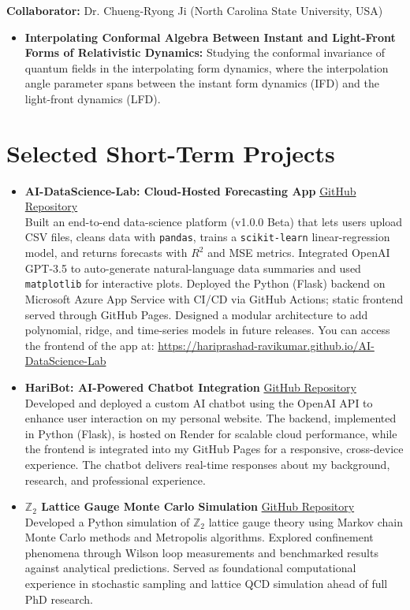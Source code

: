 \documentclass[11pt]{article}
\begin{document}
\textbf{Collaborator:} Dr. Chueng-Ryong Ji (North Carolina State University, USA)
\begin{itemize}
    \item \textbf{Interpolating Conformal Algebra Between Instant and Light-Front Forms of Relativistic Dynamics:} Studying the conformal invariance of quantum fields in the interpolating form dynamics, where the interpolation angle parameter spans between the instant form dynamics (IFD) and the light-front dynamics (LFD).
\end{itemize}
%
\section*{Selected Short-Term Projects}
\vspace{-0.3em}

\begin{itemize}
    \item \textbf{AI-DataScience-Lab: Cloud-Hosted Forecasting App} \hfill \href{https://github.com/Hariprashad-Ravikumar/AI-DataScience-Lab}{GitHub Repository} \\
    Built an end-to-end data-science platform (v1.0.0 Beta) that lets users upload CSV files, cleans data with \texttt{pandas}, trains a \texttt{scikit-learn} linear-regression model, and returns forecasts with $R^{2}$ and MSE metrics. Integrated OpenAI GPT-3.5 to auto-generate natural-language data summaries and used \texttt{matplotlib} for interactive plots. Deployed the Python (Flask) backend on Microsoft Azure App Service with CI/CD via GitHub Actions; static frontend served through GitHub Pages. Designed a modular architecture to add polynomial, ridge, and time-series models in future releases. You can access the frontend of the app at: \href{https://hariprashad-ravikumar.github.io/AI-DataScience-Lab}{https://hariprashad-ravikumar.github.io/AI-DataScience-Lab}
          
    \item \textbf{HariBot: AI-Powered Chatbot Integration} \hfill \href{https://github.com/Hariprashad-Ravikumar/Hari-ChatBot}{GitHub Repository} \\
    Developed and deployed a custom AI chatbot using the OpenAI API to enhance user interaction on my personal website. The backend, implemented in Python (Flask), is hosted on Render for scalable cloud performance, while the frontend is integrated into my GitHub Pages for a responsive, cross-device experience. The chatbot delivers real-time responses about my background, research, and professional experience.
    \item \textbf{$\mathbb{Z}_2$ Lattice Gauge Monte Carlo Simulation} \hfill \href{https://github.com/Hariprashad-Ravikumar/Z2_LatticeGauge_Monte_Carlo_Simulation}{GitHub Repository} \\
    Developed a Python simulation of $\mathbb{Z}_2$ lattice gauge theory using Markov chain Monte Carlo methods and Metropolis algorithms. Explored confinement phenomena through Wilson loop measurements and benchmarked results against analytical predictions. Served as foundational computational experience in stochastic sampling and lattice QCD simulation ahead of full PhD research.
\end{itemize}
\end{document}
